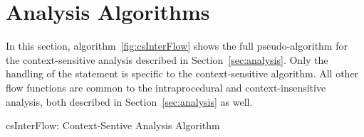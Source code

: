 \section{Analysis Algorithms}\label{app:algo}

In this section, algorithm~\ref{fig:csInterFlow} shows the full
pseudo-algorithm for the context-sensitive analysis described
in Section~\ref{sec:analysis}.
Only the handling of the \callt statement is specific to
the context-sensitive algorithm. All other flow functions
are common to the intraprocedural and context-insensitive
analysis, both described in Section~\ref{sec:analysis} as well.

\IncMargin{1em}
\begin{algorithm*}[!h]
\caption{csInterFlow: Context-Sentive Analysis Algorithm}\label{fig:csInterFlow}
\SetAlgoLined
\LinesNumbered
\DontPrintSemicolon
{}



\end{algorithm*}

